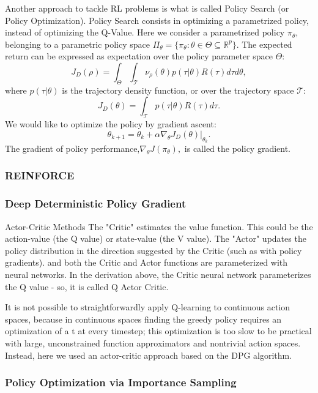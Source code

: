 Another approach to tackle RL problems is what is called Policy Search (or Policy Optimization).
Policy Search consists in optimizing a parametrized policy, instead of optimizing the Q-Value.
Here we consider a parametrized policy $\pi_\theta$, belonging to a parametric policy space \(\Pi_\theta = \{\pi_\theta:\theta \in \Theta \subseteq \mathbb{R}^p\}\). The expected return can be expressed as expectation over the policy parameter space $\Theta$: \[\] \[ J_D(\rho) = \int_{\Theta} \int_{\mathcal{T}} \nu_\rho(\theta)p(\tau|\theta)R(\tau)d\tau d\theta, \] where $p(\tau|\theta)$ is the trajectory density function, or over the trajectory space $\mathcal{T}$: \[J_D(\theta) = \int_{\mathcal{T}} p(\tau|\theta)R(\tau)d\tau.\]
We would like to optimize the policy by gradient ascent:
\[\theta_{k+1} = \theta_k + \alpha \left. \nabla_{\theta} J_D(\theta) \right|_{\theta_k}.\]
The gradient of policy performance,\(\nabla_{\theta}J(\pi_{\theta}),\) is called the policy gradient.



\subsubsection{REINFORCE}


\subsubsection{Deep Deterministic Policy Gradient}
\label{ddpg}

{Actor-Critic Methods}
The "Critic" estimates the value function. This could be the action-value (the Q value) or state-value (the V value).
The "Actor" updates the policy distribution in the direction suggested by the Critic (such as with policy gradients).
and both the Critic and Actor functions are parameterized with neural networks. In the derivation above, the Critic neural network parameterizes the Q value - so, it is called Q Actor Critic.


It is not possible to straightforwardly apply Q-learning to continuous action spaces, because in continuous spaces finding the greedy policy requires an optimization of a t at every timestep; this optimization is too slow to be practical with large, unconstrained function approximators and nontrivial action spaces. Instead, here we used an actor-critic approach based on the DPG algorithm.




\subsubsection{Policy Optimization via Importance Sampling}

